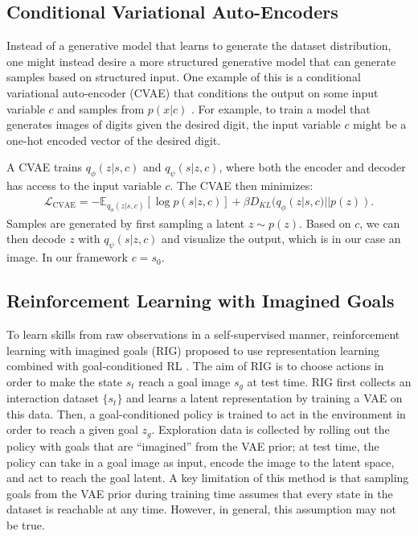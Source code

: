 \documentclass{article}
\newcommand{\E}{\mathbb{E}}
\begin{document}
\subsection{Conditional Variational Auto-Encoders}
\label{sec:cvae}

Instead of a generative model that learns to generate the dataset distribution, one might instead desire a more structured generative model that can generate samples based on structured input.
One example of this is a conditional variational auto-encoder (CVAE) that conditions the output on some input variable $c$ and samples from $p(x|c)$ \cite{sohn2015cvae}.
For example, to train a model that generates images of digits given the desired digit, the input variable $c$ might be a one-hot encoded vector of the desired digit.

A CVAE trains $q_\phi(z|s, c)$ and $q_\psi(s|z, c)$, where both the encoder and decoder has access to the input variable $c$. The CVAE then minimizes:
\begin{align} \label{eq:isc-vae-loss}
    \mathcal L_\text{CVAE} = -\E_{q_\phi(z|s, c)} [\log p(s|z, c)] + \beta D_{KL}(q_\phi(z|s, c)||p(z)).
\end{align}
Samples are generated by first sampling a latent $z \sim p(z)$. Based on $c$, we can then decode $z$ with $q_\psi(s|z, c)$ and visualize the output, which is in our case an image.
In our framework $c = s_{0}$.

\subsection{Reinforcement Learning with Imagined Goals}
\label{sec:rig}

To learn skills from raw observations in a self-supervised manner, reinforcement learning with imagined goals (RIG) proposed to use representation learning combined with goal-conditioned RL \cite{nair2018rig}.
The aim of RIG is to choose actions in order to make the state $s_t$ reach a goal image $s_g$ at test time.
RIG first collects an interaction dataset $\{s_t\}$ and learns a latent representation by training a VAE on this data.
Then, a goal-conditioned policy is trained to act in the environment in order to reach a given goal $z_g$.
Exploration data is collected by rolling out the policy with goals that are ``imagined'' from the VAE prior; at test time, the policy can take in a goal image as input, encode the image to the latent space, and act to reach the goal latent.
A key limitation of this method is that sampling goals from the VAE prior during training time assumes that every state in the dataset is reachable at any time.
However, in general, this assumption may not be true.
\end{document}
